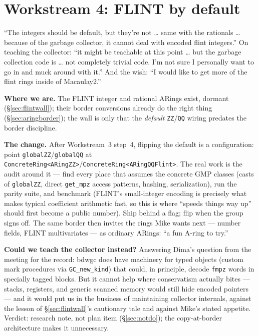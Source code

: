 \documentclass[11pt,oneside]{report}
\newcommand{\code}[1]{\textcolor{m2code}{\texttt{#1}}}
\begin{document}
\section{Workstream 4: FLINT by default}
\label{sec:ws-flint}

\begin{mikesays}[on FLINT]
``The integers should be default, but they're not \ldots{} same with the
rationals \ldots{} because of the garbage collector, it cannot deal with
encoded flint integers.'' On teaching the collector: ``it might be
teachable at this point \ldots{} but the garbage collection code is
\ldots{} not completely trivial code. I'm not sure I personally want to go
in and muck around with it.'' And the wish: ``I would like to get more of
the flint rings inside of Macaulay2.''
\end{mikesays}

\textbf{Where we are.} The FLINT integer and rational ARings exist,
dormant (\S\ref{sec:flintwall}); their border conversions already do the
right thing (\S\ref{sec:aringborder}); the wall is only that the
\emph{default} \code{ZZ}/\code{QQ} wiring predates the border discipline.

\textbf{The change.} After Workstream~3 step~4, flipping the default is a
configuration: point \code{globalZZ}/\code{globalQQ} at
\code{ConcreteRing<ARingZZ>}/\code{ConcreteRing<ARingQQFlint>}. The real
work is the audit around it --- find every place that assumes the concrete
GMP classes (casts of \code{globalZZ}, direct \code{get\_mpz} access
patterns, hashing, serialization), run the parity suite, and benchmark
(FLINT's small-integer encoding is precisely what makes typical
coefficient arithmetic fast, so this is where ``speeds things way up''
should first become a public number). Ship behind a flag; flip when the
group signs off. The same border then invites the rings Mike wants next
--- number fields, FLINT multivariates --- as ordinary ARings: ``a fun
A-ring to try.''

\textbf{Could we teach the collector instead?} Answering Dima's question
from the meeting for the record: bdwgc does have machinery for typed
objects (custom mark procedures via \code{GC\_new\_kind}) that could, in
principle, decode \code{fmpz} words in specially tagged blocks. But it
cannot help where conservatism actually bites --- stacks, registers, and
generic scanned memory would still hide encoded pointers --- and it would
put us in the business of maintaining collector internals, against the
lesson of \S\ref{sec:flintwall}'s cautionary tale and against Mike's
stated appetite. Verdict: research note, not plan item
(\S\ref{sec:notdo}); the copy-at-border architecture makes it unnecessary.
\end{document}
